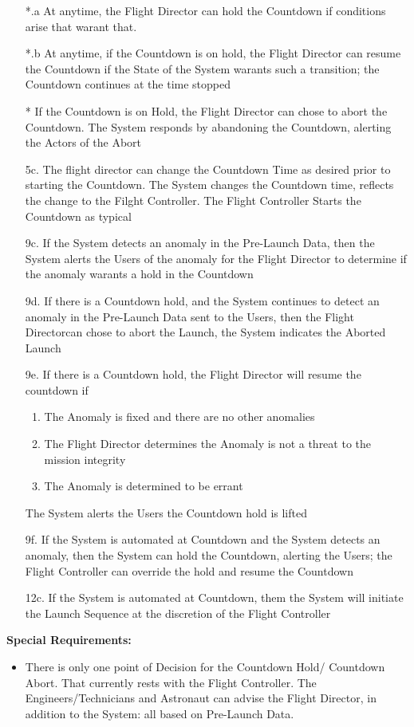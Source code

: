 \documentclass[letterpaper]{article}
\begin{document}
\begin{itemize}
\item[*.a]  At anytime, the Flight Director can hold the Countdown
if conditions arise that warant that.
\item[*.b] At anytime, if the Countdown is on hold, the Flight
Director can resume the Countdown if the State of the System warants
such a transition;  the Countdown continues at the time stopped
\item[*] If the Countdown is on Hold, the Flight Director can chose to
abort the Countdown.  The System responds by abandoning the Countdown,
alerting the Actors of the Abort
\item[5c.] The flight director can change the Countdown Time as
desired prior to starting the Countdown.  The System changes the
Countdown time, reflects the change to the Filght Controller.  The
Flight Controller Starts the Countdown as typical
\item[9c.]  If the System detects an anomaly in the
Pre-Launch Data, then the System alerts the Users of the anomaly for
the Flight Director to determine if the anomaly warants a hold in the
Countdown
\item[9d.]  If there is a Countdown hold, and the System continues to
detect an anomaly in the Pre-Launch Data sent to the Users, then the
Flight Directorcan chose to abort the Launch, the System indicates the
Aborted Launch
\item[9e.]  If there is a Countdown hold, the Flight Director will
resume the countdown if
\begin{enumerate}
\item The Anomaly is fixed and there are no other anomalies
\item The Flight Director determines the Anomaly is not a threat
to the mission integrity
\item The Anomaly is determined to be errant
\end{enumerate}
The System alerts the Users the Countdown hold is lifted
\item[9f.] If the System is automated at Countdown and the System
detects an anomaly, then the System can hold the Countdown, alerting
the Users;  the Flight Controller can override the hold and resume the
Countdown
\item[12c.] If the System is automated at Countdown, them the System
will initiate the Launch Sequence at the discretion of the Flight
Controller
\end{itemize}
\textbf{Special Requirements: }
\begin{itemize}
\item There is only one point of Decision for the Countdown Hold/
Countdown Abort.  That currently rests with the Flight Controller.  The
Engineers/Technicians and Astronaut can advise the Flight Director, in
addition to the System:  all based on Pre-Launch Data.
\end{itemize}
\end{document}
